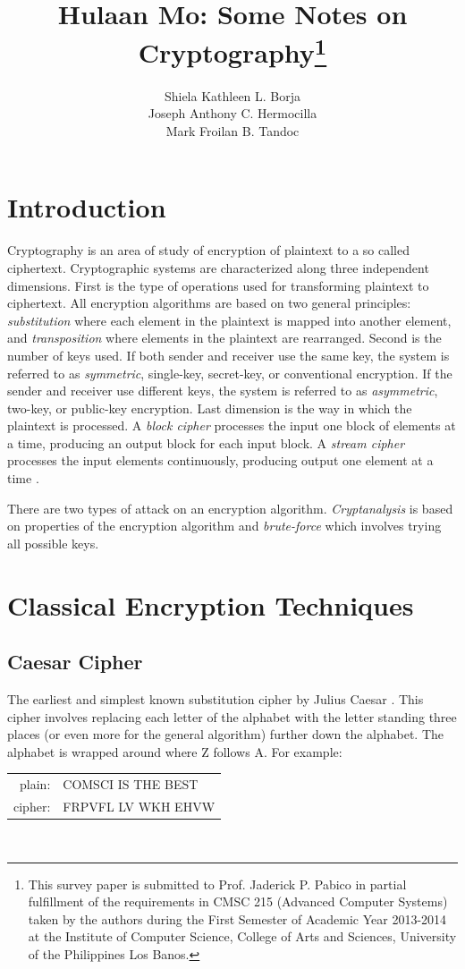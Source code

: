 \documentclass{article}
\title{Hulaan Mo: Some Notes on Cryptography\footnote{This survey paper is submitted to Prof. Jaderick P. Pabico in partial fulfillment of the requirements in CMSC 215 (Advanced Computer Systems) taken  by the authors during the First Semester of Academic Year 2013-2014 at the Institute of Computer Science, College of Arts and Sciences, University of the Philippines Los Banos.}}
\author{Shiela Kathleen L. Borja\\Joseph Anthony C. Hermocilla\\Mark Froilan B. Tandoc}
\date{}
\begin{document}
\maketitle

\section{Introduction}
Cryptography is an area of study of encryption of plaintext to a so called ciphertext. Cryptographic systems are characterized along three independent dimensions. First is the type of operations used for transforming plaintext to ciphertext. All encryption algorithms are based on two general principles: \textit{substitution} where each element in the plaintext is mapped into another element, and \textit{transposition} where elements in the plaintext are rearranged. Second is the number of keys used. If both sender and receiver use the same key, the system is referred to as \textit{symmetric}, single-key, secret-key, or conventional encryption. If the sender and receiver use different keys, the system is referred to as \textit{asymmetric}, two-key, or public-key encryption. Last dimension is the way in which the plaintext is processed. A \textit{block cipher} processes the input one block of elements at a time, producing an output block for each input block. A \textit{stream cipher} processes the input elements continuously, producing output one element at a time \cite{stallings2011}.

There are two types of attack on an encryption algorithm. \textit{Cryptanalysis} is based on properties of the encryption algorithm and \textit{brute-force} which involves trying all possible keys.

\section{Classical Encryption Techniques}
\subsection{Caesar Cipher}
The earliest and simplest known substitution cipher by Julius Caesar \cite{stallings2011}. This cipher involves replacing each letter of the alphabet with the letter standing three places (or even more for the general algorithm) further down the alphabet. The alphabet is wrapped around where Z follows A. For example:
\\

\begin{tabular}{r l}
	plain: & COMSCI IS THE BEST\\
	cipher: & FRPVFL LV WKH EHVW
\end{tabular}
\\
\end{document}
